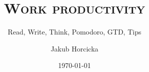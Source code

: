 \documentclass[xcolor=dvipsnames]{beamer}
\author{Jakub Horcicka}
\title{\textsc{Work productivity}}
\subtitle{Read, Write, Think, Pomodoro, GTD, Tips}
\date{\today}
\begin{document}
 
  \begin{frame}
    \titlepage
  \end{frame}

  
  
  
  
  
  
\end{document}
